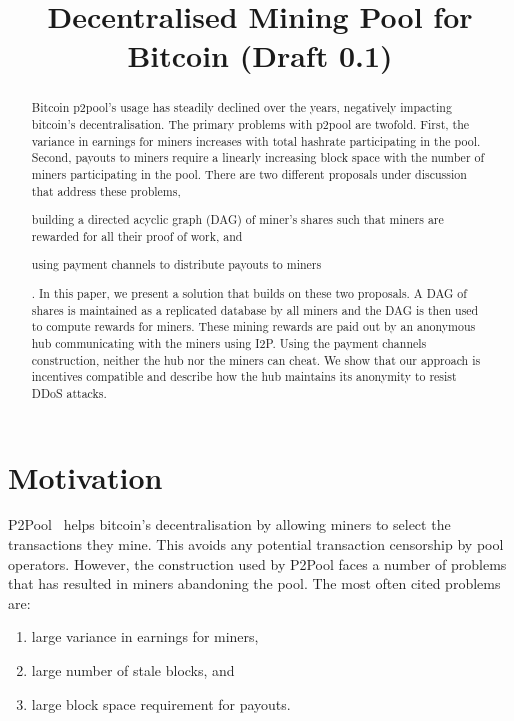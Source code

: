 \documentclass{article}
\title{Decentralised Mining Pool for Bitcoin (Draft 0.1)}
\author{}
\date{}
\begin{document}
\maketitle

\begin{abstract}
  Bitcoin p2pool's usage has steadily declined over the years,
  negatively impacting bitcoin's decentralisation. The primary
  problems with p2pool are twofold. First, the variance in earnings
  for miners increases with total hashrate participating in the
  pool. Second, payouts to miners require a linearly increasing block
  space with the number of miners participating in the pool. There are
  two different proposals under discussion that address these
  problems,
  \begin{enumerate*}[label=(\roman*)]
  \item building a directed acyclic graph (DAG) of miner's shares such
    that miners are rewarded for all their proof of work, and
  \item  using payment channels to distribute payouts to miners
  \end{enumerate*}. In this paper, we present a solution that builds
  on these two proposals. A DAG of shares is maintained as a
  replicated database by all miners and the DAG is then used to
  compute rewards for miners. These mining rewards are paid out by an
  anonymous hub communicating with the miners using I2P. Using the
  payment channels construction, neither the hub nor the miners can
  cheat. We show that our approach is incentives compatible and
  describe how the hub maintains its anonymity to resist DDoS attacks.
\end{abstract}
   
\section{Motivation}

P2Pool~\cite{p2pool:wiki} helps bitcoin's decentralisation by allowing
miners to select the transactions they mine. This avoids any potential
transaction censorship by pool operators. However, the construction
used by P2Pool faces a number of problems that has resulted in miners
abandoning the pool. The most often cited problems are:

\begin{enumerate}
\item large variance in earnings for miners,
\item large number of stale blocks, and
\item large block space requirement for payouts.
\end{enumerate}
\end{document}
